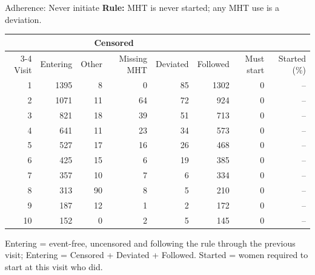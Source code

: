 \documentclass[aspectratio=169]{beamer}
\begin{document}
\begin{frame}{Adherence: Never initiate}
\centering
{\small \textbf{Rule:} MHT is never started; any MHT use is a deviation.}\par\vspace{6pt}
{\scriptsize
\begin{tabular}{r r r r r r r r}
\toprule
 & & \multicolumn{2}{c}{Censored} & & & & \\
\cmidrule(lr){3-4}
Visit & Entering & Other & Missing MHT & Deviated & Followed & Must start & Started (\%) \\
\midrule
1 & 1395 & 8 & 0 & 85 & 1302 & 0 & -- \\
2 & 1071 & 11 & 64 & 72 & 924 & 0 & -- \\
3 & 821 & 18 & 39 & 51 & 713 & 0 & -- \\
4 & 641 & 11 & 23 & 34 & 573 & 0 & -- \\
5 & 527 & 17 & 16 & 26 & 468 & 0 & -- \\
6 & 425 & 15 & 6 & 19 & 385 & 0 & -- \\
7 & 357 & 10 & 7 & 6 & 334 & 0 & -- \\
8 & 313 & 90 & 8 & 5 & 210 & 0 & -- \\
9 & 187 & 12 & 1 & 2 & 172 & 0 & -- \\
10 & 152 & 0 & 2 & 5 & 145 & 0 & -- \\
\bottomrule
\end{tabular}}
\par\vspace{6pt}
{\tiny Entering = event-free, uncensored and following the rule through the previous visit; Entering = Censored + Deviated + Followed. Started = women required to start at this visit who did.}
\end{frame}
\end{document}

